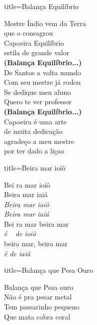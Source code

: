 \documentclass[fontsize=14pt, paper=a4, twoside, DIV=20]{scrreprt} %
\begin{document}
\begin{multicols*}{2}
\begin{song}{title={Balança Equilíbrio}}
\begin{verse*}
        Mestre Índio vem da Terra\\
        que o consagrou\\
        Capoeira Equilíbrio\\
        estila de grande valor\\
        \textbf{(Balança Equilíbrio...)}\\

        De Santos a volta mundo\\
        Com seu mestre já rodou\\
        Se dedique meu aluno\\
        Quero te ver professor\\
        \textbf{(Balança Equilíbrio...)}\\

        Capoeira é uma arte\\
        de muita dedicação\\
        agradeço a meu mestre\\
        por ter dado a liçao\\
    \end{verse*}
\end{song}

\begin{song}{title={Beira mar ioiô}}
    \begin{verse*}
        Bei ra mar ioiô\\
        Beira mar iaiá\\
        \textit{Beira mar ioiô}\\
        \textit{Beira mar iaiá}\\

        Bei ra mar beira mar\\
        \textit{é} \ \textit{ de ioiô}\\
        beira mar, beira mar\\
        \textit{é de iaiá}\\
    \end{verse*}
\end{song}

\begin{song}{title={Balança que Pesa Ouro}}
        \begin{verse*}
        Balança que Pesa ouro \\ 
        Não é pra pesar metal \\ 
        Tem passarinho pequeno \\ 
        Que mata cobra coral \\
                

\end{verse*}
\end{song}
\end{multicols*}
\end{document}
